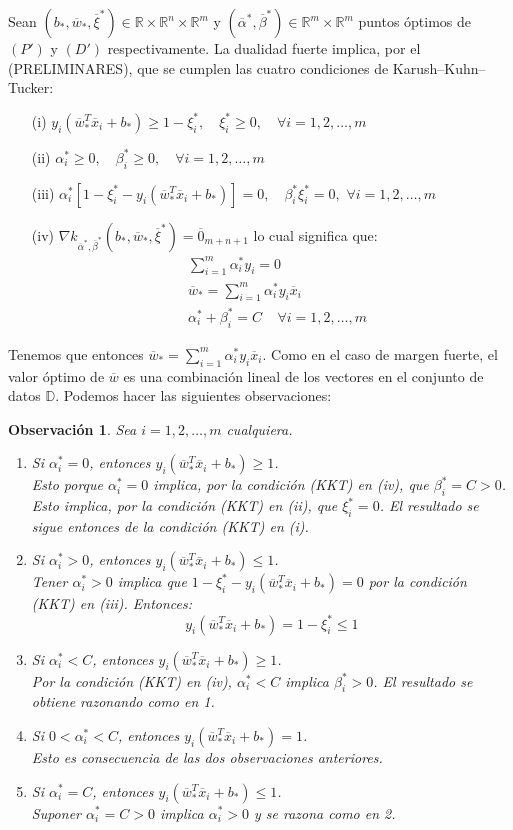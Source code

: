 \documentclass[11pt]{article}
\newtheorem{observation}{Observación}[section]
\newcommand{\R}{\mathbb{R}}
\newcommand{\Rn}{\R^{n}}
\newcommand{\Rm}{\R^{m}}
\newcommand{\Runm}{\R\times\Rn\times\Rm}
\newcommand{\xiv}{\overline{\xi}}
\newcommand{\av}{\overline{\alpha}}
\newcommand{\bev}{\overline{\beta}}
\newcommand{\wv}{\overline{w}}
\newcommand{\x}{\overline{x}}
\newcommand{\Sm}{1,2,\ldots, m}
\newcommand{\bo}{b_{*}}
\newcommand{\wo}{\wv_{*}}
\newcommand{\avo}{\av^{*}}
\newcommand{\bevo}{\bev^{*}}
\newcommand{\xivo}{\xiv^{*}}
\newcommand{\alio}{\alpha_{i}^{*}}
\newcommand{\xiio}{\xi_{i}^{*}}
\newcommand{\beio}{\beta_{i}^{*}}
\newcommand{\Dat}{\mathbb{D}}
\begin{document}
Sean $(\bo, \wo, \xivo)\in\Runm$ y $(\avo, \bevo)\in\Rm\times\Rm$ puntos óptimos de $(P')$ y $(D')$ respectivamente. La dualidad fuerte implica, por el (PRELIMINARES), que se cumplen las cuatro condiciones de Karush--Kuhn--Tucker:
\begin{itemize}
\item[(i)] $y_{i}(\wo^{T}\x_{i}+\bo)\geq1-\xiio,\quad \xiio\geq0,\quad \forall i=\Sm$
\item[(ii)] $\alio\geq0,\quad\beio\geq0,\quad\forall i=\Sm$
\item[(iii)] $\alio[1-\xiio-y_{i}(\wo^{T}\x_{i}+\bo)]=0,\quad\beio\xiio=0,$ $\forall i=\Sm$
\item[(iv)] $\nabla k_{\avo,\bevo}(\bo, \wo, \xivo)=\overline{0}_{m+n+1}$ lo cual significa que:
\begin{equation*}
\begin{aligned}
&\sum_{i=1}^{m}\alio y_{i}=0\\
&\wo=\sum_{i=1}^{m}\alio y_{i}\x_{i}\\
&\alio+\beio=C\ \ \ \ \ \forall i=\Sm
\end{aligned}
\end{equation*}
\end{itemize}
Tenemos que entonces $\wo=\sum_{i=1}^{m}\alio y_{i}\x_{i}$. Como en el caso de margen fuerte, el valor óptimo de $\wv$ es una combinación lineal de los vectores en el conjunto de datos $\Dat$. Podemos hacer las siguientes observaciones:\\
\begin{observation}
Sea $i=\Sm$ cualquiera.
\begin{enumerate} 
\item Si $\alio=0$, entonces $y_{i}(\wo^{T}\x_{i}+\bo)\geq1$.\\
Esto porque $\alio=0$ implica, por la condición (KKT) en (iv), que $\beio=C>0$. Esto implica, por la condición (KKT) en (ii), que $\xiio=0$. El resultado se sigue entonces de la condición (KKT) en (i).

\item Si $\alio>0$, entonces $y_{i}(\wo^{T}\x_{i}+\bo)\leq1$.\\
Tener $\alio>0$ implica que $1-\xiio-y_{i}(\wo^{T}\x_{i}+\bo)=0$ por la condición (KKT) en (iii). Entonces:
$$y_{i}(\wo^{T}\x_{i}+\bo)=1-\xiio\leq1$$

\item Si $\alio<C$, entonces $y_{i}(\wo^{T}\x_{i}+\bo)\geq1$.\\
Por la condición (KKT) en (iv), $\alio<C$ implica $\beio>0$. El resultado se obtiene razonando como en 1.

\item Si $0<\alio<C$, entonces $y_{i}(\wo^{T}\x_{i}+\bo)=1$.\\
Esto es consecuencia de las dos observaciones anteriores.

\item Si $\alio=C$, entonces $y_{i}(\wo^{T}\x_{i}+\bo)\leq1$.\\
Suponer $\alio=C>0$ implica $\alio>0$ y se razona como en 2.
\end{enumerate}
\end{observation}
\end{document}
